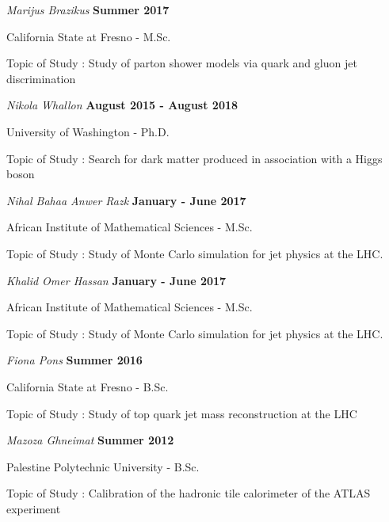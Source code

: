 \documentclass[10pt]{article}
\newenvironment{innerlist}[1][\enskip\textbullet]%
        {\begin{compactitem}[#1]}{\end{compactitem}}
\begin{document}
\begin{itemize}
\item[] \textit{Marijus Brazikus} 
    \hfill \textbf{Summer 2017} 
    \begin{innerlist}
	\item California State at Fresno - M.Sc.
	\item Topic of Study : Study of parton shower models via quark and gluon jet discrimination
    \end{innerlist}

\item[] \textit{Nikola Whallon} 
    \hfill \textbf{August 2015 - August 2018} 
    \begin{innerlist}
	\item University of Washington - Ph.D. 
	\item Topic of Study : Search for dark matter produced in association with a Higgs boson
    \end{innerlist}

\item[] \textit{Nihal Bahaa Anwer Razk} 
    \hfill \textbf{January - June 2017} 
    \begin{innerlist}
	\item African Institute of Mathematical Sciences - M.Sc.
	\item Topic of Study : Study of Monte Carlo simulation for jet physics at the LHC.
    \end{innerlist}

\item[] \textit{Khalid Omer Hassan} 
    \hfill \textbf{January - June 2017} 
    \begin{innerlist}
	\item African Institute of Mathematical Sciences - M.Sc.
	\item Topic of Study : Study of Monte Carlo simulation for jet physics at the LHC.
    \end{innerlist}
    
\item[] \textit{Fiona Pons} 
    \hfill \textbf{Summer 2016} 
    \begin{innerlist}
	\item California State at Fresno - B.Sc.
	\item Topic of Study : Study of top quark jet mass reconstruction at the LHC
    \end{innerlist}
    
\item[] \textit{Mazoza Ghneimat}
    \hfill \textbf{Summer 2012} 
    \begin{innerlist}
	\item Palestine Polytechnic University - B.Sc.
	\item Topic of Study : Calibration of the hadronic tile calorimeter of the ATLAS experiment
    \end{innerlist}
    
\end{itemize}
\end{document}
